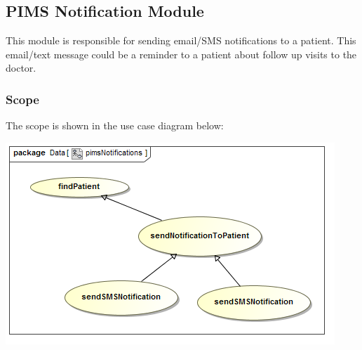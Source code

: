 \subsection{PIMS Notification Module}
This module is responsible for sending email/SMS notifications to a patient. This email/text message could be a reminder to a patient about follow up visits to the doctor. \par 

\subsubsection{Scope}
The scope is shown in the use case diagram below: \par
\includegraphics[width=0.75\linewidth]{./Graphics/pimsNotification/pimsNotifications}

